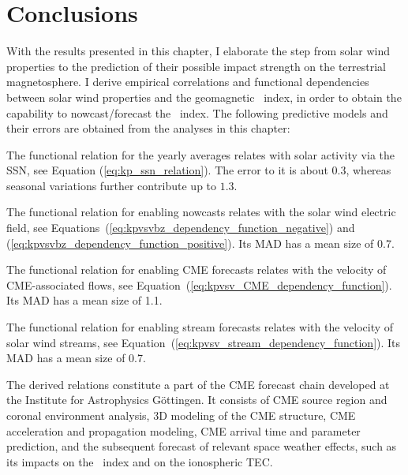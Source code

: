 

\section{Conclusions}
\label{sec:conclusions_ch2}
With the results presented in this chapter, I elaborate the step from solar wind properties to the prediction of their possible impact strength on the terrestrial magnetosphere. I derive empirical correlations and functional dependencies between solar wind properties and the geomagnetic \Kp~index, in order to obtain the capability to nowcast/forecast the \Kp~index. The following predictive models and their errors are obtained from the \Kp{} analyses in this chapter:
\begin{itemize*}
	\item The functional relation for the yearly \Kp{} averages relates \Kp{} with solar activity via the SSN, see Equation (\ref{eq:kp_ssn_relation}). The \Kp{} error to it is about $0.3$, whereas seasonal variations further contribute up to $1.3$.
	\item The functional relation for enabling \Kp{} nowcasts relates \Kp{} with the solar wind electric field, see Equations~(\ref{eq:kpvsvbz_dependency_function_negative}) and (\ref{eq:kpvsvbz_dependency_function_positive}). Its MAD has a mean \Kp{} size of \num{0.7}.
	\item The functional relation for enabling CME forecasts relates \Kp{} with the velocity of CME-associated flows, see Equation~(\ref{eq:kpvsv_CME_dependency_function}). Its MAD has a mean \Kp{} size of \num{1.1}.
	\item The functional relation for enabling stream forecasts relates \Kp{} with the velocity of solar wind streams, see Equation~(\ref{eq:kpvsv_stream_dependency_function}). Its MAD has a mean \Kp{} size of \num{0.7}.
\end{itemize*}

\pagebreak

The derived \Kp{} relations constitute a part of the CME forecast chain developed at the Institute for Astrophysics Göttingen. It consists of CME source region and coronal environment analysis, 3D modeling of the CME structure, CME acceleration and propagation modeling, CME arrival time and parameter prediction, and the subsequent forecast of relevant space weather effects, such as its impacts on the \Kp~index and on the ionospheric TEC.

